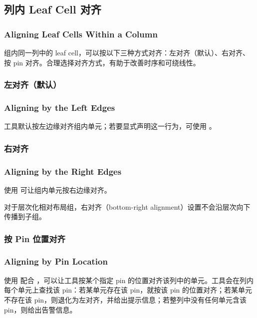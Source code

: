 \subsection{列内 Leaf Cell 对齐}
\subsubsection*{Aligning Leaf Cells Within a Column}

组内同一列中的 leaf cell，可以按以下三种方式对齐：左对齐（默认）、右对齐、按 pin 对齐。合理选择对齐方式，有助于改善时序和可绕线性。

\subsubsection{左对齐（默认）}
\subsubsection*{Aligning by the Left Edges}

工具默认按左边缘对齐组内单元；若要显式声明这一行为，可使用 。

\subsubsection{右对齐}
\subsubsection*{Aligning by the Right Edges}

使用  可让组内单元按右边缘对齐。

\begin{noteBox}
对于层次化相对布局组，右对齐（bottom-right alignment）设置不会沿层次向下传播到子组。
\end{noteBox}

\subsubsection{按 Pin 位置对齐}
\subsubsection*{Aligning by Pin Location}

使用  配合 ，可以让工具按某个指定 pin 的位置对齐该列中的单元。工具会在列内每个单元上查找该 pin：若某单元存在该 pin，就按该 pin 的位置对齐；若某单元不存在该 pin，则退化为左对齐，并给出提示信息；若整列中没有任何单元含该 pin，则给出告警信息。

